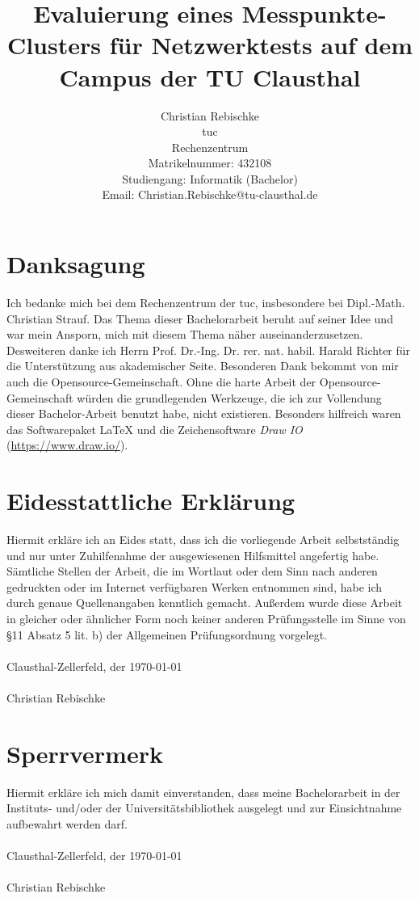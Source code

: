 \documentclass[titlepage]{report}
\title{Evaluierung eines Messpunkte-Clusters für Netzwerktests auf dem
Campus der TU Clausthal}
\author{Christian Rebischke\\
\gls{tuc}\\
Rechenzentrum\\
Matrikelnummer: 432108 \\
Studiengang: Informatik (Bachelor) \\
Email: Christian.Rebischke@tu-clausthal.de}
\begin{document}
\maketitle
\chapter*{Danksagung}
Ich bedanke mich bei dem Rechenzentrum der \gls{tuc}, insbesondere bei
Dipl.\hyp{}Math. Christian Strauf. Das Thema dieser Bachelorarbeit
beruht auf seiner Idee und war mein Ansporn, mich mit diesem Thema näher
auseinanderzusetzen. Desweiteren danke ich Herrn Prof. Dr.\hyp{}Ing. Dr.
rer. nat. habil. Harald Richter für die Unterstützung aus akademischer
Seite. Besonderen Dank bekommt von mir auch die
Opensource\hyp{}Gemeinschaft.  Ohne die harte Arbeit der
Opensource\hyp{}Gemeinschaft würden die grundlegenden Werkzeuge, die
ich zur Vollendung dieser Bachelor-Arbeit benutzt habe, nicht
existieren. Besonders hilfreich waren das Softwarepaket \LaTeX{} und die
Zeichensoftware \emph{Draw IO} (\url{https://www.draw.io/}).
\chapter*{Eidesstattliche Erklärung}
Hiermit erkläre ich an Eides statt, dass ich die vorliegende Arbeit
selbstständig und nur unter Zuhilfenahme der ausgewiesenen Hilfsmittel
angefertig habe. Sämtliche Stellen der Arbeit, die im Wortlaut oder dem
Sinn nach anderen gedruckten oder im Internet verfügbaren Werken
entnommen sind, habe ich durch genaue Quellenangaben kenntlich gemacht.
Außerdem wurde diese Arbeit in gleicher oder ähnlicher Form noch keiner
anderen Prüfungsstelle im Sinne von \S 11 Absatz 5 lit. b) der
Allgemeinen Prüfungsordnung vorgelegt.
\\
\\
Clausthal-Zellerfeld, der \today
\\
\\
Christian Rebischke
\chapter*{Sperrvermerk}
Hiermit erkläre ich mich damit einverstanden, dass meine Bachelorarbeit
 in der Instituts- und/oder der Universitätsbibliothek ausgelegt
und zur Einsichtnahme aufbewahrt werden darf.
\\
\\
Clausthal-Zellerfeld, der \today
\\
\\
Christian Rebischke
\tableofcontents
\end{document}

